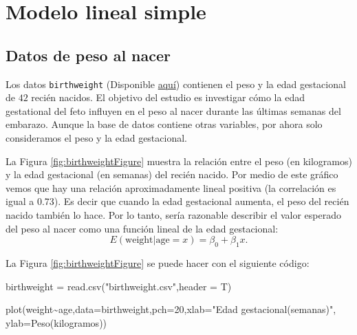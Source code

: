 \documentclass[
]{article}
\newenvironment{Shaded}{\begin{snugshade}}{\end{snugshade}}
\newcommand{\AttributeTok}[1]{\textcolor[rgb]{0.77,0.63,0.00}{#1}}
\newcommand{\DecValTok}[1]{\textcolor[rgb]{0.00,0.00,0.81}{#1}}
\newcommand{\FunctionTok}[1]{\textcolor[rgb]{0.00,0.00,0.00}{#1}}
\newcommand{\NormalTok}[1]{#1}
\newcommand{\OtherTok}[1]{\textcolor[rgb]{0.56,0.35,0.01}{#1}}
\newcommand{\SpecialCharTok}[1]{\textcolor[rgb]{0.00,0.00,0.00}{#1}}
\newcommand{\StringTok}[1]{\textcolor[rgb]{0.31,0.60,0.02}{#1}}
\begin{document}
\hypertarget{modelo-lineal-simple}{%
\section{Modelo lineal simple}\label{modelo-lineal-simple}}

\hypertarget{datos-de-peso-al-nacer}{%
\subsection*{Datos de peso al nacer}\label{datos-de-peso-al-nacer}}

Los datos \texttt{birthweight} (Disponible \href{https://raw.githubusercontent.com/AlvaroFlorez/MLG1/master/Birthweight.csv}{aquí}) contienen el peso y la edad gestacional de \(42\) recién nacidos. El objetivo del estudio es investigar cómo la edad gestational del feto influyen en el peso al nacer durante las últimas semanas del embarazo. Aunque la base de datos contiene otras variables, por ahora solo consideramos el peso y la edad gestacional.

La Figura \ref{fig:birthweightFigure} muestra la relación entre el peso (en kilogramos) y la edad gestacional (en semanas) del recién nacido. Por medio de este gráfico vemos que hay una relación aproximadamente lineal positiva (la correlación es igual a 0.73). Es decir que cuando la edad gestacional aumenta, el peso del recién nacido también lo hace. Por lo tanto, sería razonable describir el valor esperado del peso al nacer como una función lineal de la edad gestacional:
\[
E(\mbox{weight}|\mbox{age}=x) = \beta_{0} + \beta_{1}x.
\]

La Figura \ref{fig:birthweightFigure} se puede hacer con el siguiente código:

\begin{Shaded}
\begin{Highlighting}[]
\NormalTok{birthweight }\OtherTok{=} \FunctionTok{read.csv}\NormalTok{(}\StringTok{"birthweight.csv"}\NormalTok{,}\AttributeTok{header =}\NormalTok{ T)}

\FunctionTok{plot}\NormalTok{(weight}\SpecialCharTok{\textasciitilde{}}\NormalTok{age,}\AttributeTok{data=}\NormalTok{birthweight,}\AttributeTok{pch=}\DecValTok{20}\NormalTok{,}\AttributeTok{xlab=}\StringTok{"Edad gestacional(semanas)"}\NormalTok{,}
     \AttributeTok{ylab=}\StringTok{\textquotesingle{}Peso(kilogramos)\textquotesingle{}}\NormalTok{)}
\end{Highlighting}
\end{Shaded}
\end{document}
